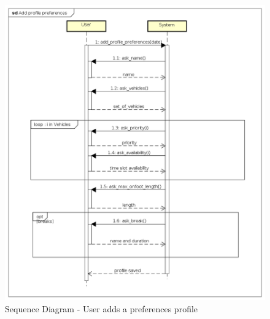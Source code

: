 \begin{figure}
	\centering
	\includegraphics[totalheight = \textheight] {Images/SequenceDiagrams/10_Add_profile_preferences.png}
	\caption{\label{fig: sequenceDiagram10}Sequence Diagram - User adds a preferences profile }
\end{figure}